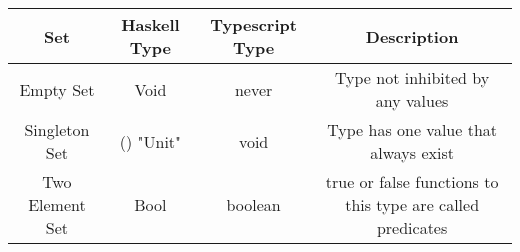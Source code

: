 \documentclass{article}
\begin{document}
\begin{center}
\begin{tabular}{||c c c c||} 
 \hline
 Set & Haskell Type & Typescript Type & Description \\ [0.5ex] 
 \hline\hline
 Empty Set & Void & never & Type not inhibited by any values \\
 \hline
Singleton Set & () "Unit" & void & Type has one value that always exist \\
 \hline
Two Element Set & Bool & boolean & true or false functions to this type are called predicates\\ [1ex] 
 \hline
\end{tabular}
\end{center}
\end{document}
